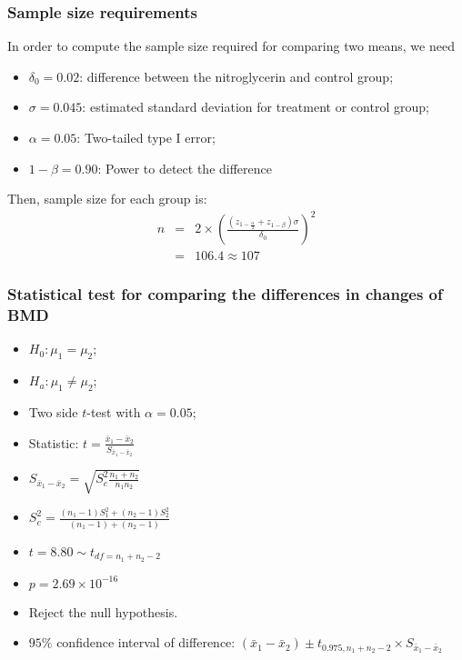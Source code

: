 \documentclass[table,10pt]{beamer}
\begin{document}
\begin{CJK*}{UTF8}{gbsn}
\begin{frame}[t]
\frametitle{Sample size requirements}
In order to compute the sample size required for comparing two means, we need
\begin{itemize}
	\item $\delta_0 = 0.02$: difference between the nitroglycerin and control group;
	\item $\sigma = 0.045$: estimated standard deviation for treatment or control group;
	\item $\alpha = 0.05$: Two-tailed type I error;
	\item $1-\beta = 0.90$: Power to detect the difference
\end{itemize}

Then, sample size for each group is:
$$
\begin{aligned}
n &=& 2 \times \left( \frac{(z_{1-\frac{\alpha}{2}} + z_{1-\beta})\sigma}{\delta_0}\right)^2\\
 &=& 106.4 \approx 107
\end{aligned}
$$ 
\end{frame}

\begin{frame}[t]
\frametitle{Statistical test for comparing the differences in changes of BMD}
\begin{itemize}
	\item $H_0: \mu_1 = \mu_2$;
	\item $H_a: \mu_1 \neq \mu_2$;
	\item Two side $t$-test with $\alpha = 0.05$;
	\item Statistic: $t = \frac{\bar{x}_1 - \bar{x}_2}{S_{\bar{x}_1 - \bar{x}_2}}$
	\item $S_{\bar{x}_1 - \bar{x}_2} = \sqrt{S_c^2 \frac{n_1 + n_2}{n_1 n_2}}$
	\item $S_c^2 = \frac{(n_1-1)S_1^2 + (n_2 - 1)S_2^2}{(n_1-1)+(n_2-1)}$
	\item $t = 8.80 \sim t_{df=n_1+n_2-2}$
	\item $p = 2.69 \times 10^{-16}$
	\item Reject the null hypothesis.
	\item $95\%$ confidence interval of difference: $(\bar{x}_1 - \bar{x}_2) \pm t_{0.975, n_1+n_2-2} 
		\times S_{\bar{x}_1 - \bar{x}_2}$
\end{itemize}
\end{frame}



\end{CJK*}
\end{document}
